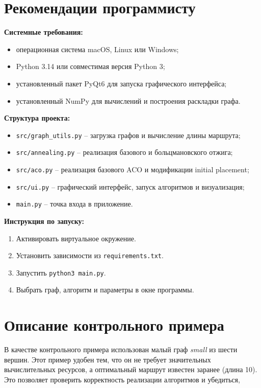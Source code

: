 \documentclass[12pt,a4paper]{article}
\begin{document}
\section{Рекомендации программисту}
\label{sec:developer_recommendations}

\textbf{Системные требования:}
\begin{itemize}
    \item операционная система macOS, Linux или Windows;
    \item Python 3.14 или совместимая версия Python 3;
    \item установленный пакет PyQt6 для запуска графического интерфейса;
    \item установленный NumPy для вычислений и построения раскладки графа.
\end{itemize}

\textbf{Структура проекта:}
\begin{itemize}
    \item \texttt{src/graph\_utils.py} -- загрузка графов и вычисление длины маршрута;
    \item \texttt{src/annealing.py} -- реализация базового и больцмановского отжига;
    \item \texttt{src/aco.py} -- реализация базового ACO и модификации initial placement;
    \item \texttt{src/ui.py} -- графический интерфейс, запуск алгоритмов и визуализация;
    \item \texttt{main.py} -- точка входа в приложение.
\end{itemize}


\textbf{Инструкция по запуску:}
\begin{enumerate}
    \item Активировать виртуальное окружение.
    \item Установить зависимости из \texttt{requirements.txt}.
    \item Запустить \texttt{python3 main.py}.
    \item Выбрать граф, алгоритм и параметры в окне программы.
\end{enumerate}

\section{Описание контрольного примера}
\label{sec:control_example}

В качестве контрольного примера использован малый граф \textit{small} из шести
вершин. Этот пример удобен тем, что он не требует значительных вычислительных ресурсов,
а оптимальный маршрут известен заранее (длина 10). Это позволяет проверить
корректность реализации алгоритмов и убедиться,
\end{document}
